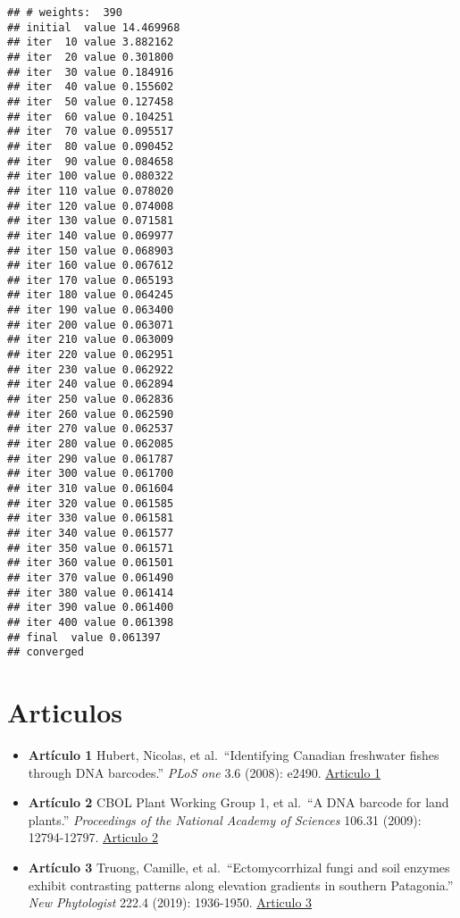 \documentclass[
]{book}
\begin{document}
\begin{verbatim}
## # weights:  390
## initial  value 14.469968 
## iter  10 value 3.882162
## iter  20 value 0.301800
## iter  30 value 0.184916
## iter  40 value 0.155602
## iter  50 value 0.127458
## iter  60 value 0.104251
## iter  70 value 0.095517
## iter  80 value 0.090452
## iter  90 value 0.084658
## iter 100 value 0.080322
## iter 110 value 0.078020
## iter 120 value 0.074008
## iter 130 value 0.071581
## iter 140 value 0.069977
## iter 150 value 0.068903
## iter 160 value 0.067612
## iter 170 value 0.065193
## iter 180 value 0.064245
## iter 190 value 0.063400
## iter 200 value 0.063071
## iter 210 value 0.063009
## iter 220 value 0.062951
## iter 230 value 0.062922
## iter 240 value 0.062894
## iter 250 value 0.062836
## iter 260 value 0.062590
## iter 270 value 0.062537
## iter 280 value 0.062085
## iter 290 value 0.061787
## iter 300 value 0.061700
## iter 310 value 0.061604
## iter 320 value 0.061585
## iter 330 value 0.061581
## iter 340 value 0.061577
## iter 350 value 0.061571
## iter 360 value 0.061501
## iter 370 value 0.061490
## iter 380 value 0.061414
## iter 390 value 0.061400
## iter 400 value 0.061398
## final  value 0.061397 
## converged
\end{verbatim}

\hypertarget{articulos}{%
\section{Articulos}\label{articulos}}

\begin{itemize}
\item
  \textbf{Artículo 1} Hubert, Nicolas, et al.~``Identifying Canadian freshwater fishes through DNA barcodes.'' \emph{PLoS one} 3.6 (2008): e2490. \href{articulos/Articulo_1-Hubert_et_al_2008.pdf}{Articulo 1}
\item
  \textbf{Artículo 2} CBOL Plant Working Group 1, et al.~``A DNA barcode for land plants.'' \emph{Proceedings of the National Academy of Sciences} 106.31 (2009): 12794-12797. \href{articulos/Articulo_2-Hollingsworth_et_al_2009.pdf}{Articulo 2}
\item
  \textbf{Artículo 3} Truong, Camille, et al.~``Ectomycorrhizal fungi and soil enzymes exhibit contrasting patterns along elevation gradients in southern Patagonia.'' \emph{New Phytologist} 222.4 (2019): 1936-1950. \href{articulos/Articulo_3_Truong-knowfungi-2017.pdf}{Articulo 3}
\end{itemize}
\end{document}
